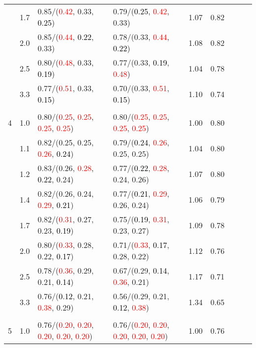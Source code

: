 \documentclass[10pt,a4paper]{report}
\begin{document}
\begin{table}[!htbp]
\begin{center}
{\begin{tabular}{ccllccccc}
			&1.7&0.85/(\textcolor{red}{0.42}, 0.33, \textcolor{black}{0.25})&0.79/(\textcolor{black}{0.25}, \textcolor{red}{0.42}, 0.33)&1.07&0.82\\
			&2.0&0.85/(\textcolor{red}{0.44}, \textcolor{black}{0.22}, 0.33)&0.78/(0.33, \textcolor{red}{0.44}, \textcolor{black}{0.22})&1.08&0.82\\
			&2.5&0.80/(\textcolor{red}{0.48}, 0.33, \textcolor{black}{0.19})&0.77/(0.33, \textcolor{black}{0.19}, \textcolor{red}{0.48})&1.04&0.78\\
			&3.3&0.77/(\textcolor{red}{0.51}, 0.33, \textcolor{black}{0.15})&0.70/(0.33, \textcolor{red}{0.51}, \textcolor{black}{0.15})&1.10&0.74\\
			&&&&\\
			4			&1.0&0.80/(\textcolor{red}{0.25}, \textcolor{red}{0.25}, \textcolor{red}{0.25}, \textcolor{red}{0.25})&0.80/(\textcolor{red}{0.25}, \textcolor{red}{0.25}, \textcolor{red}{0.25}, \textcolor{red}{0.25})&1.00&0.80\\
			&1.1&0.82/(0.25, 0.25, \textcolor{red}{0.26}, \textcolor{black}{0.24})&0.79/(\textcolor{black}{0.24}, \textcolor{red}{0.26}, 0.25, 0.25)&1.04&0.80\\
			&1.2&0.83/(0.26, \textcolor{red}{0.28}, \textcolor{black}{0.22}, 0.24)&0.77/(\textcolor{black}{0.22}, \textcolor{red}{0.28}, 0.24, 0.26)&1.07&0.80\\
			&1.4&0.82/(0.26, 0.24, \textcolor{red}{0.29}, \textcolor{black}{0.21})&0.77/(\textcolor{black}{0.21}, \textcolor{red}{0.29}, 0.26, 0.24)&1.06&0.79\\
			&1.7&0.82/(\textcolor{red}{0.31}, 0.27, 0.23, \textcolor{black}{0.19})&0.75/(\textcolor{black}{0.19}, \textcolor{red}{0.31}, 0.23, 0.27)&1.09&0.78\\
			&2.0&0.80/(\textcolor{red}{0.33}, 0.28, 0.22, \textcolor{black}{0.17})&0.71/(\textcolor{red}{0.33}, \textcolor{black}{0.17}, 0.28, 0.22)&1.12&0.76\\
			&2.5&0.78/(\textcolor{red}{0.36}, 0.29, 0.21, \textcolor{black}{0.14})&0.67/(0.29, \textcolor{black}{0.14}, \textcolor{red}{0.36}, 0.21)&1.17&0.71\\
			&3.3&0.76/(\textcolor{black}{0.12}, 0.21, \textcolor{red}{0.38}, 0.29)&0.56/(0.29, 0.21, \textcolor{black}{0.12}, \textcolor{red}{0.38})&1.34&0.65\\
			&&&&\\
			5			&1.0&0.76/(\textcolor{red}{0.20}, \textcolor{red}{0.20}, \textcolor{red}{0.20}, \textcolor{red}{0.20}, \textcolor{red}{0.20})&0.76/(\textcolor{red}{0.20}, \textcolor{red}{0.20}, \textcolor{red}{0.20}, \textcolor{red}{0.20}, \textcolor{red}{0.20})&1.00&0.76\\

\end{tabular}}
\end{center}
\end{table}
\end{document}
